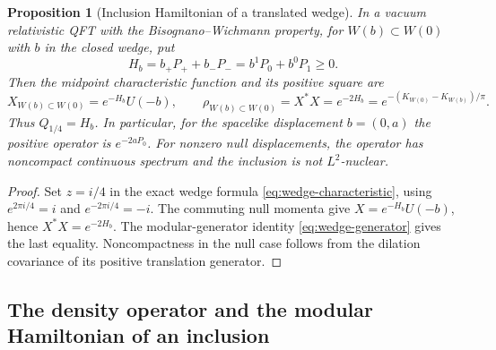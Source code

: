 \documentclass[a4paper,11pt]{article}
\newtheorem{proposition}[theorem]{Proposition}
\theoremstyle{definition}
\begin{document}
\begin{proposition}[Inclusion Hamiltonian of a translated wedge]\label{prop:wedge-nuclearity}
In a vacuum relativistic QFT with the Bisognano--Wichmann property, for $W(b)\subset W(0)$ with $b$ in the closed wedge, put
\begin{equation}
 H_b=b_+P_++b_-P_-=b^1P_0+b^0P_1\ge0.
\end{equation}
Then the midpoint characteristic function and its positive square are
\begin{equation}
 X_{W(b)\subset W(0)}=e^{-H_b}U(-b),\qquad
 \rho_{W(b)\subset W(0)}=X^*X=e^{-2H_b}
 =e^{-(K_{W(0)}-K_{W(b)})/\pi}.
 \label{eq:qft-wedge-rho}
\end{equation}
Thus $Q_{1/4}=H_b$. In particular, for the spacelike displacement $b=(0,a)$ the positive operator is $e^{-2aP_0}$. For nonzero null displacements, the operator has noncompact continuous spectrum and the inclusion is not $L^2$-nuclear.
\end{proposition}
\begin{proof}
Set $z=i/4$ in the exact wedge formula \eqref{eq:wedge-characteristic}, using $e^{2\pi i/4}=i$ and $e^{-2\pi i/4}=-i$. The commuting null momenta give $X=e^{-H_b}U(-b)$, hence $X^*X=e^{-2H_b}$. The modular-generator identity \eqref{eq:wedge-generator} gives the last equality. Noncompactness in the null case follows from the dilation covariance of its positive translation generator.
\end{proof}

\subsection{The density operator and the modular Hamiltonian of an inclusion}
\end{document}

